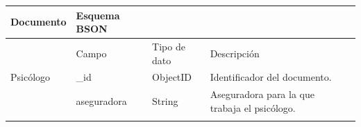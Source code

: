 \begin{table}[htpb]
\centering
\begin{tabularx}{\textwidth}{|l|X|X|X|X|}
\hline
Documento          & Esquema BSON                                                                                                                                           &                                                                                                                            &                                                                                                                                                                                                                                                                             \\ \hline
                   & Campo                                                                                                                                                  & Tipo de dato                                                                                                               & Descripción                                                                                                                                                                                                                                                                 \\ \hline
Psicólogo         & \_id                                                                                                                                                   & ObjectID                                                                                                                   & Identificador del documento.                                                                                                                                                                                                                                                \\ \hline
\multirow{18}{*}{} & aseguradora                                                                                                                                            & String                                                                                                                     & Aseguradora para la que trabaja el psicólogo.                                                                                                                                                                                                                               \\ \cline{2-4} 

\end{tabularx}
\end{table}
